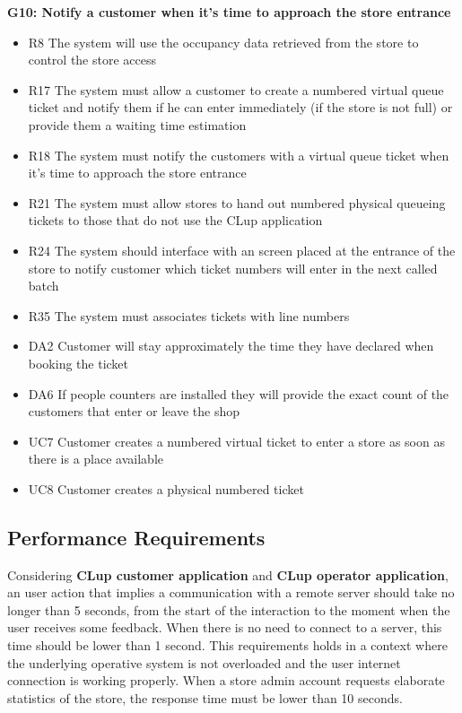 \textbf{G10: Notify a customer when it's time to approach the store entrance}
\begin{itemize}[label=\textcolor{clup_blue2}{\textbullet}]
    \item R8 The system will use the occupancy data retrieved from the store to control the store access
    \item R17 The system must allow a customer to create a numbered virtual queue ticket and notify them if he can enter immediately (if the store is not full) or provide them a waiting time estimation
    \item R18 The system must notify the customers with a virtual queue ticket when it’s time to approach the store entrance
    \item R21 The system must allow stores to hand out numbered physical queueing tickets to those that do not use the CLup application
    \item R24 The system should interface with an screen placed at the entrance of the store to notify customer which ticket numbers will enter in the next called batch
    \item R35 The system must associates tickets with line numbers
\end{itemize}
\begin{itemize}[label=\textcolor{clup_red}{\textbullet}]
    \item DA2 Customer will stay approximately the time they have declared when booking the ticket
    \item DA6 If people counters are installed they will provide the exact count of the customers that enter or leave the shop
\end{itemize}
\begin{itemize}[label=\textcolor{clup_yellow}{\textbullet}]
    \item UC7 Customer creates a numbered virtual ticket to enter a store as soon as there is a place available
    \item UC8 Customer creates a physical numbered ticket
\end{itemize}

\vfill
\pagebreak

\subsection{Performance Requirements}
Considering \textbf{CLup customer application} and \textbf{CLup operator application}, an user action that implies a communication with a remote server should take no longer than 5 seconds, from the start of the interaction to the moment when the user receives some feedback. When there is no need to connect to a server, this time should be lower than 1 second. This requirements holds in a context where the underlying operative system is not overloaded and the user internet connection is working properly.
\smallskip
When a store admin account requests elaborate statistics of the store, the response time must be lower than 10 seconds.
